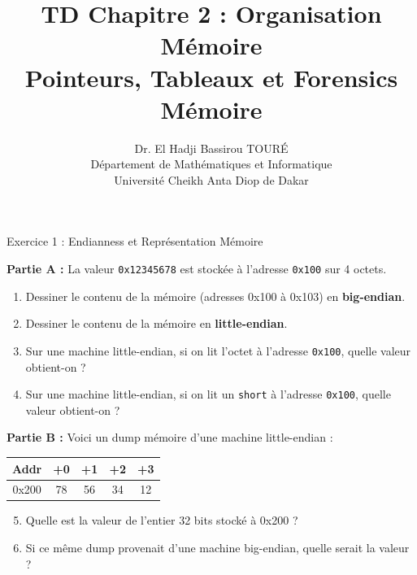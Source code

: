\documentclass[10pt,a4paper]{article}
\title{\textbf{TD Chapitre 2 : Organisation Mémoire}\\
\large Pointeurs, Tableaux et Forensics Mémoire}
\author{Dr. El Hadji Bassirou TOURÉ\\
Département de Mathématiques et Informatique\\
Université Cheikh Anta Diop de Dakar}
\date{}
\begin{document}
\maketitle

\begin{exercicebox}{Exercice 1 : Endianness et Représentation Mémoire}

\textbf{Partie A :} La valeur \texttt{0x12345678} est stockée à l'adresse \texttt{0x100} sur 4 octets.

\begin{enumerate}[label=\alph*)]
    \item Dessiner le contenu de la mémoire (adresses 0x100 à 0x103) en \textbf{big-endian}.
    \item Dessiner le contenu de la mémoire en \textbf{little-endian}.
    \item Sur une machine little-endian, si on lit l'octet à l'adresse \texttt{0x100}, quelle valeur obtient-on ?
    \item Sur une machine little-endian, si on lit un \texttt{short} à l'adresse \texttt{0x100}, quelle valeur obtient-on ?
\end{enumerate}

\textbf{Partie B :} Voici un dump mémoire d'une machine little-endian :

\begin{center}
\renewcommand{\arraystretch}{1.2}
\begin{tabular}{|c|c|c|c|c|}
\hline
\textbf{Addr} & \textbf{+0} & \textbf{+1} & \textbf{+2} & \textbf{+3} \\
\hline
0x200 & 78 & 56 & 34 & 12 \\
\hline
\end{tabular}
\end{center}

\begin{enumerate}[label=\alph*)]
    \setcounter{enumi}{4}
    \item Quelle est la valeur de l'entier 32 bits stocké à 0x200 ?
    \item Si ce même dump provenait d'une machine big-endian, quelle serait la valeur ?
\end{enumerate}

\end{exercicebox}
\end{document}
